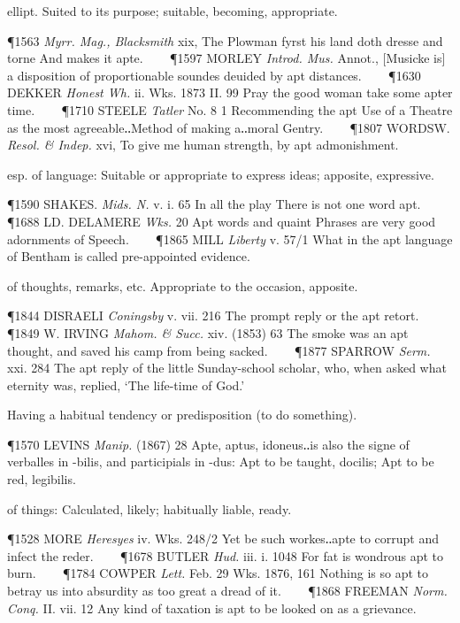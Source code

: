 \begin{description}[wide, labelwidth=!, labelindent=0pt]
\begin{myenumerate}
 ellipt. Suited to its purpose; suitable, becoming, appropriate.

\P 1563 \textit{Myrr. Mag., Blacksmith} xix, The Plowman fyrst his land doth dresse and torne And makes it apte.    
\P 1597 MORLEY  \textit{Introd. Mus.} Annot., [Musicke is] a disposition of proportionable soundes deuided by apt distances.    
\P 1630 DEKKER  \textit{Honest Wh.} ii. Wks. 1873 II. 99 Pray the good woman take some apter time.    
\P 1710 STEELE  \textit{Tatler} No. 8 1 Recommending the apt Use of a Theatre as the most agreeable‥Method of making a‥moral Gentry.    
\P 1807 WORDSW.  \textit{Resol. \& Indep.} xvi, To give me human strength, by apt admonishment.

 esp. of language: Suitable or appropriate to express ideas; apposite, expressive.

\P 1590 SHAKES.  \textit{Mids. N.} v. i. 65 In all the play There is not one word apt.    
\P 1688 LD. DELAMERE  \textit{Wks.} 20 Apt words and quaint Phrases are very good adornments of Speech.    
\P 1865 MILL  \textit{Liberty} v. 57/1 What in the apt language of Bentham is called pre-appointed evidence.

 of thoughts, remarks, etc. Appropriate to the occasion, apposite.

\P 1844 DISRAELI  \textit{Coningsby} v. vii. 216 The prompt reply or the apt retort.    
\P 1849 W. IRVING  \textit{Mahom. \& Succ.} xiv. (1853) 63 The smoke was an apt thought, and saved his camp from being sacked.    
\P 1877 SPARROW  \textit{Serm.} xxi. 284 The apt reply of the little Sunday-school scholar, who, when asked what eternity was, replied, ‘The life-time of God.’

 Having a habitual tendency or predisposition (to do something).

\P 1570 LEVINS  \textit{Manip.} (1867) 28 Apte, aptus, idoneus‥is also the signe of verballes in -bilis, and participials in -dus: Apt to be taught, docilis; Apt to be red, legibilis.

 of things: Calculated, likely; habitually liable, ready.

\P 1528 MORE  \textit{Heresyes} iv. Wks. 248/2 Yet be such workes‥apte to corrupt and infect the reder.    
\P 1678 BUTLER  \textit{Hud.} iii. i. 1048 For fat is wondrous apt to burn.    
\P 1784 COWPER  \textit{Lett.} Feb. 29 Wks. 1876, 161 Nothing is so apt to betray us into absurdity as too great a dread of it.    
\P 1868 FREEMAN  \textit{Norm. Conq.} II. vii. 12 Any kind of taxation is apt to be looked on as a grievance.


\end{myenumerate}
\end{description}
